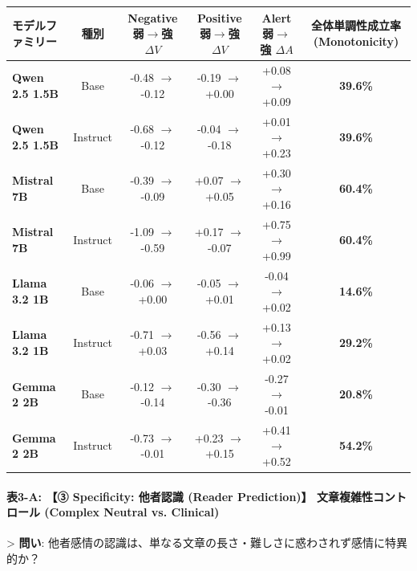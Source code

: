 \begin{center}
\small
\begin{tabular}{lccccc}
\toprule
\textbf{モデルファミリー} & \textbf{種別} & \textbf{Negative 弱$\rightarrow$強 $\Delta V$} & \textbf{Positive 弱$\rightarrow$強 $\Delta V$} & \textbf{Alert 弱$\rightarrow$強 $\Delta A$} & \textbf{全体単調性成立率 (Monotonicity)} \\
\midrule
\textbf{Qwen 2.5 1.5B} & Base & -0.48 $\rightarrow$ -0.12 & -0.19 $\rightarrow$ +0.00 & +0.08 $\rightarrow$ +0.09 & \textbf{39.6\%} \\
\textbf{Qwen 2.5 1.5B} & Instruct & -0.68 $\rightarrow$ -0.12 & -0.04 $\rightarrow$ -0.18 & +0.01 $\rightarrow$ +0.23 & \textbf{39.6\%} \\
\textbf{Mistral 7B} & Base & -0.39 $\rightarrow$ -0.09 & +0.07 $\rightarrow$ +0.05 & +0.30 $\rightarrow$ +0.16 & \textbf{60.4\%} \\
\textbf{Mistral 7B} & Instruct & -1.09 $\rightarrow$ -0.59 & +0.17 $\rightarrow$ -0.07 & +0.75 $\rightarrow$ +0.99 & \textbf{60.4\%} \\
\textbf{Llama 3.2 1B} & Base & -0.06 $\rightarrow$ +0.00 & -0.05 $\rightarrow$ +0.01 & -0.04 $\rightarrow$ +0.02 & \textbf{14.6\%} \\
\textbf{Llama 3.2 1B} & Instruct & -0.71 $\rightarrow$ +0.03 & -0.56 $\rightarrow$ +0.14 & +0.13 $\rightarrow$ +0.02 & \textbf{29.2\%} \\
\textbf{Gemma 2 2B} & Base & -0.12 $\rightarrow$ -0.14 & -0.30 $\rightarrow$ -0.36 & -0.27 $\rightarrow$ -0.01 & \textbf{20.8\%} \\
\textbf{Gemma 2 2B} & Instruct & -0.73 $\rightarrow$ -0.01 & +0.23 $\rightarrow$ +0.15 & +0.41 $\rightarrow$ +0.52 & \textbf{54.2\%} \\
\bottomrule
\end{tabular}
\end{center}


\paragraph{表3-A: 【③ Specificity: 他者認識 (Reader Prediction)】 文章複雑性コントロール (Complex Neutral vs. Clinical)}
> \textbf{問い}: 他者感情の認識は、単なる文章の長さ・難しさに惑わされず感情に特異的か？

